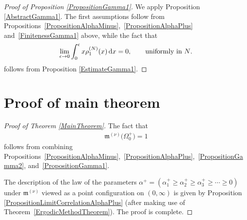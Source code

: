 \begin{proof}[Proof of Proposition \ref{PropositionGamma1}] We apply Proposition \ref{AbstractGamma1}. The first assumptions follow from Pro\-po\-si\-tions~\ref{PropositionAlphaMinus},~\ref{PropositionAlphaPlus} and~\ref{FinitenessGamma1} above, while the fact that
\begin{gather*}
\lim_{\epsilon \to 0} \int_{0}^{\epsilon}x \rho_1^{(N)}(x)\,{\rm d}x=0, \qquad \text{uniformly in $N$}.
\end{gather*}
follows from Proposition \ref{EstimateGamma1}.
\end{proof}
\section{Proof of main theorem}\label{section8}

\begin{proof}[Proof of Theorem \ref{MainTheorem}]
The fact that
\begin{gather*}
\mathfrak{m}^{(\nu)}\big(\Omega_0^+\big)=1
\end{gather*}
follows from combining Propositions~\ref{PropositionAlphaMinus},~\ref{PropositionAlphaPlus},~\ref{PropositionGamma2}, and~\ref{PropositionGamma1}.

The description of the law of the parameters $\alpha^+=\left(\alpha^+_1\ge \alpha_2^+\ge\alpha_3^+\ge \cdots \ge 0\right)$ under $\mathfrak{m}^{(\nu)}$ viewed as a point configuration on $(0,\infty)$ is given by Proposition \ref{PropositionLimitCorrelationAlphaPlus} (after making use of Theorem~\ref{ErgodicMethodTheorem}). The proof is complete.
\end{proof}

